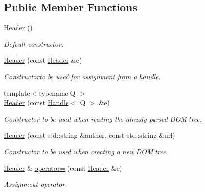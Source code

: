 \subsection*{Public Member Functions}
\begin{DoxyCompactItemize}
\item 
\hyperlink{class_d_d4hep_1_1_geometry_1_1_header_a577016069dd076aa2127e4ee0c60eb7c}{Header} ()
\begin{DoxyCompactList}\small\item\em Default constructor. \item\end{DoxyCompactList}\item 
\hyperlink{class_d_d4hep_1_1_geometry_1_1_header_a613572c6f7759e5758865fd622fc54d7}{Header} (const \hyperlink{class_d_d4hep_1_1_geometry_1_1_header}{Header} \&e)
\begin{DoxyCompactList}\small\item\em Constructorto be used for assignment from a handle. \item\end{DoxyCompactList}\item 
{\footnotesize template$<$typename Q $>$ }\\\hyperlink{class_d_d4hep_1_1_geometry_1_1_header_af0d0b82d83d933705b185c5908b3b738}{Header} (const \hyperlink{class_d_d4hep_1_1_handle}{Handle}$<$ Q $>$ \&e)
\begin{DoxyCompactList}\small\item\em Constructor to be used when reading the already parsed DOM tree. \item\end{DoxyCompactList}\item 
\hyperlink{class_d_d4hep_1_1_geometry_1_1_header_ad5ea22234771c462b3202ee97d3b0bba}{Header} (const std::string \&author, const std::string \&url)
\begin{DoxyCompactList}\small\item\em Constructor to be used when creating a new DOM tree. \item\end{DoxyCompactList}\item 
\hyperlink{class_d_d4hep_1_1_geometry_1_1_header}{Header} \& \hyperlink{class_d_d4hep_1_1_geometry_1_1_header_acc0a56dbbdcf868bccd82d1bc8216821}{operator=} (const \hyperlink{class_d_d4hep_1_1_geometry_1_1_header}{Header} \&e)
\begin{DoxyCompactList}\small\item\em Assignment operator. \item\end{DoxyCompactList}\item 

\end{DoxyCompactItemize}
